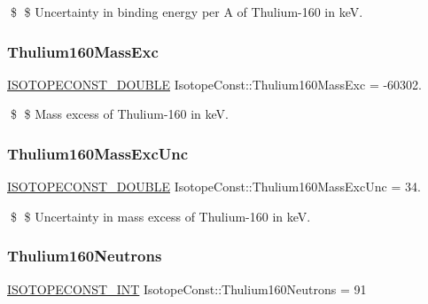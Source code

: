 \$ \$ Uncertainty in binding energy per A of Thulium-\/160 in keV. \mbox{\label{group___isotope_const-_thulium-_tm160_ga7b9d3340acd7fbec212bf2be3082b307}} 
\subsubsection{\texorpdfstring{Thulium160\+Mass\+Exc}{Thulium160MassExc}}
{\footnotesize\ttfamily \mbox{\hyperlink{group___isotope_const-_macros_ga8f45a7272ce02c0b4c65c44636ed719a}{I\+S\+O\+T\+O\+P\+E\+C\+O\+N\+S\+T\+\_\+\+D\+O\+U\+B\+LE}} Isotope\+Const\+::\+Thulium160\+Mass\+Exc = -\/60302.}

\$ \$ Mass excess of Thulium-\/160 in keV. \mbox{\label{group___isotope_const-_thulium-_tm160_ga11132dc8003e5fe40cd1a6346f1d2f0e}} 
\subsubsection{\texorpdfstring{Thulium160\+Mass\+Exc\+Unc}{Thulium160MassExcUnc}}
{\footnotesize\ttfamily \mbox{\hyperlink{group___isotope_const-_macros_ga8f45a7272ce02c0b4c65c44636ed719a}{I\+S\+O\+T\+O\+P\+E\+C\+O\+N\+S\+T\+\_\+\+D\+O\+U\+B\+LE}} Isotope\+Const\+::\+Thulium160\+Mass\+Exc\+Unc = 34.}

\$ \$ Uncertainty in mass excess of Thulium-\/160 in keV. \mbox{\label{group___isotope_const-_thulium-_tm160_ga71f75e0d9400a627b832387327f04feb}} 
\subsubsection{\texorpdfstring{Thulium160\+Neutrons}{Thulium160Neutrons}}
{\footnotesize\ttfamily \mbox{\hyperlink{group___isotope_const-_macros_ga5f18360b3e99483a35c32d789e62621c}{I\+S\+O\+T\+O\+P\+E\+C\+O\+N\+S\+T\+\_\+\+I\+NT}} Isotope\+Const\+::\+Thulium160\+Neutrons = 91}

